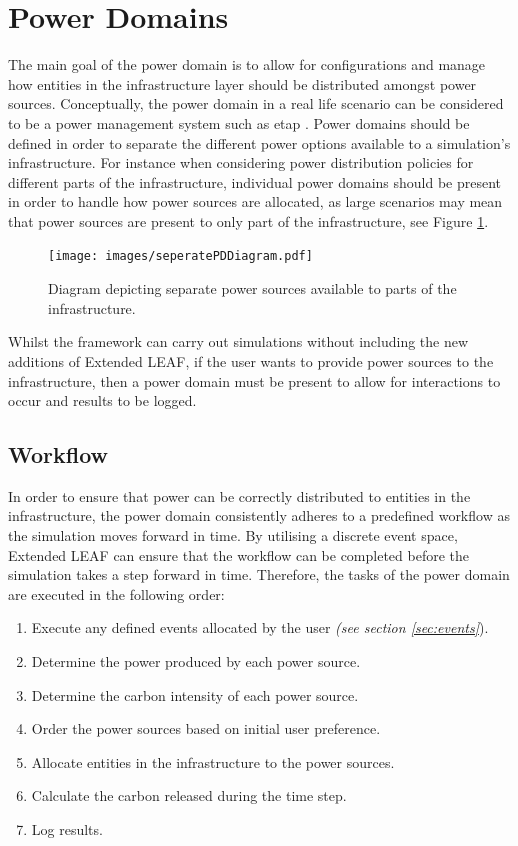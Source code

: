 \documentclass{l4proj}
\begin{document}
\section{Power Domains}\label{sec:power-domains}
The main goal of the power domain is to allow for configurations and manage how entities in the infrastructure layer should be distributed amongst power sources.
Conceptually, the power domain in a real life scenario can be considered to be a power management system such as etap \citep{etap}.
Power domains should be defined in order to separate the different power options available to a simulation's infrastructure.
For instance when considering power distribution policies for different parts of the infrastructure, individual power domains should be present in order to handle how power sources are allocated, as large scenarios may mean that power sources are present to only part of the infrastructure, see Figure \ref{fig:seperatePDs}.
\begin{figure}[htbp]
    \centering
    \texttt{[image: images/seperatePDDiagram.pdf]}
    ~
    \caption{Diagram depicting separate power sources available to parts of the infrastructure.}
    \label{fig:seperatePDs}
\end{figure}

Whilst the framework can carry out simulations without including the new additions of Extended LEAF, if the user wants to provide power sources to the infrastructure, then a power domain must be present to allow for interactions to occur and results to be logged.

\subsection{Workflow}\label{subsec:power-domain-workflow}
In order to ensure that power can be correctly distributed to entities in the infrastructure, the power domain consistently adheres to a predefined workflow as the simulation moves forward in time.
By utilising a discrete event space, Extended LEAF can ensure that the workflow can be completed before the simulation takes a step forward in time.
Therefore, the tasks of the power domain are executed in the following order:
\begin{enumerate}
    \item Execute any defined events allocated by the user \emph{(see section \ref{sec:events}}).
    \item Determine the power produced by each power source.
    \item Determine the carbon intensity of each power source.
    \item Order the power sources based on initial user preference.
    \item Allocate entities in the infrastructure to the power sources.
    \item Calculate the carbon released during the time step.
    \item Log results.
\end{enumerate}
\end{document}
